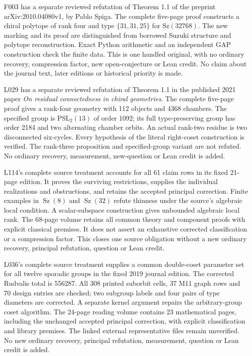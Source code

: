 \documentclass[11pt,a4paper]{article}
\begin{document}
F003 has a separate reviewed refutation of Theorem 1.1 of the preprint
arXiv:2010.04080v1, by Pablo Spiga. The complete five-page proof constructs a
chiral polytope of rank four and type $\{31,31,25\}$ for $\mathrm{Sz}(32768)$.
The new marking and its proof are distinguished from borrowed Suzuki structure
and polytope reconstruction. Exact Python arithmetic and an independent GAP
construction check the finite data. This is one handled original, with no
ordinary recovery, compression factor, new open-conjecture or Lean credit.
No claim about the journal text, later editions or historical priority is made.

L029 has a separate reviewed refutation of Theorem 1.1 in the published
2021 paper \emph{On residual connectedness in chiral geometries}. The
complete five-page proof gives a rank-four geometry with 112 objects and
4368 chambers. The specified group is $\mathrm{PSL}_2(13)$ of order 1092;
its full type-preserving group has order 2184 and two alternating chamber
orbits. An actual rank-two residue is two disconnected six-cycles. Every
hypothesis of the literal right-coset construction is verified. The
rank-three proposition and specified-group variant are not refuted. No
ordinary recovery, measurement, new-question or Lean credit is added.

L114's complete source treatment accounts for all 61 claim rows in its fixed
21-page edition. It proves the surviving restrictions, supplies the individual
realizations and obstructions, and retains the accepted principal correction.
Finite examples in $\operatorname{Sz}(8)$ and $\operatorname{Sz}(32)$ refute
thinness under the source's algebraic local condition. A scalar-subspace
construction gives unbounded algebraic local rank. The 68-page volume retains
all common theory and component proofs with explicit classical premises.
It does not assert an exhaustive corrected classification or a compression
factor. This closes one source obligation without a new ordinary recovery,
principal refutation, question or Lean credit.

L036's complete source treatment supplies a common double-coset parameter
set for all twelve sporadic groups in the fixed 2019 journal edition.
The corrected Rudvalis total is 556287. All 308 printed suborbit cells,
37 M11 graph rows and 70 design entries are checked; two subgroup labels
and four pairs of type diameters are corrected. A separate kernel
argument repairs the arbitrary-group coset algorithm. The 24-page
reading volume contains 23 mathematical pages, including the unchanged
accepted principal correction, with explicit classification and library
premises. The linked external representative files remain unverified.
No new ordinary recovery, principal refutation, measurement, question
or Lean credit is added.
\end{document}
